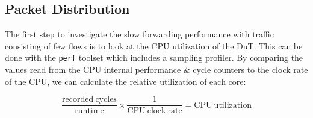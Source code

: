 \documentclass[IN,11pt,twoside,openright,master,english]{tumthesis}
\begin{document}
\subsection{Packet Distribution}
The first step to investigate the slow forwarding performance with traffic consisting of few flows is to look at the CPU utilization of the DuT. This can be done with the \texttt{perf} toolset which includes a sampling profiler. By comparing the values read from the CPU internal performance \& cycle counters to the clock rate of the CPU, we can calculate the relative utilization of each core:

\begin{equation}\label{eq-cpu}
\dfrac{\mathrm{recorded\ cycles}}{\mathrm{runtime}} \times \dfrac{1}{\mathrm{CPU\ clock\ rate}} = \mathrm{CPU\ utilization}
\end{equation}

\end{document}
